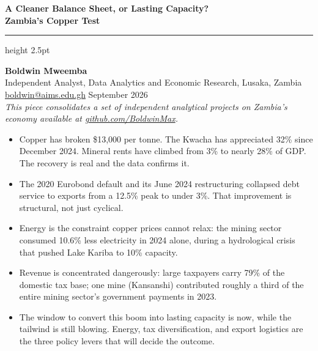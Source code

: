 \documentclass[11pt,a4paper]{article}
\begin{document}
\thispagestyle{fancy}

\begin{center}

{\fontsize{22}{27}\selectfont\bfseries\color{NavyBlue}
A Cleaner Balance Sheet, or Lasting Capacity?\\[4pt]
Zambia's Copper Test}

\vspace{10pt}
\color{Amber}\hrule height 2.5pt
\vspace{10pt}

{\large\color{LabelDark}
\textbf{Boldwin Mweemba}}\\[3pt]
{\normalsize\color{SubText}
Independent Analyst, Data Analytics and Economic Research, Lusaka, Zambia\\
\href{mailto:boldwin@aims.edu.gh}{boldwin@aims.edu.gh}
\quad\textbullet\quad September 2026\\[4pt]
{\small\color{SubText}\textit{This piece consolidates a set of independent
analytical projects on Zambia's economy available at
\href{https://github.com/BoldwinMax}{github.com/BoldwinMax}.}}}

\end{center}

\vspace{14pt}

\begin{tcolorbox}[keyfindingsbox]
\begin{itemize}[leftmargin=14pt, itemsep=4pt, topsep=2pt]
  \item Copper has broken \$13,000 per tonne. The Kwacha has appreciated
        32\% since December 2024. Mineral rents have climbed from 3\% to
        nearly 28\% of GDP. The recovery is real and the data confirms it.
  \item The 2020 Eurobond default and its June 2024 restructuring collapsed
        debt service to exports from a 12.5\% peak to under 3\%. That
        improvement is structural, not just cyclical.
  \item Energy is the constraint copper prices cannot relax: the mining
        sector consumed 10.6\% less electricity in 2024 alone, during a
        hydrological crisis that pushed Lake Kariba to 10\% capacity.
  \item Revenue is concentrated dangerously: large taxpayers carry 79\% of
        the domestic tax base; one mine (Kansanshi) contributed roughly a
        third of the entire mining sector's government payments in 2023.
  \item The window to convert this boom into lasting capacity is now, while
        the tailwind is still blowing. Energy, tax diversification, and
        export logistics are the three policy levers that will decide the
        outcome.
\end{itemize}
\end{tcolorbox}
\end{document}

